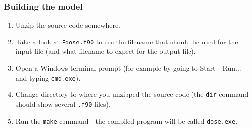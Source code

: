 \subsubsection*{Building the model}

\begin{enumerate}

\item Unzip the source code somewhere.

\item Take a look at \texttt{F{\bslash}dose.f90} to see the filename that should be used for the 
input file (and what filename to expect for the output file).

\item Open a Windows terminal prompt (for example by going to Start---Run... and typing 
\texttt{cmd.exe}).

\item Change directory to where you unzipped the source code (the \texttt{dir} command should show 
several \texttt{.f90} files).

\item Run the \texttt{make} command - the compiled program will be called \texttt{dose.exe}.

\end{enumerate}




